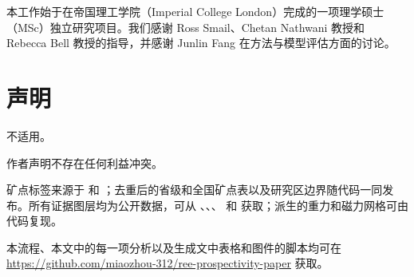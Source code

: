 \documentclass[pdflatex,sn-apa]{sn-jnl}
\begin{document}
\backmatter

本工作始于在帝国理工学院（Imperial College London）完成的一项理学硕士（MSc）独立研究项目。我们感谢 Ross Smail、Chetan Nathwani 教授和 Rebecca Bell 教授的指导，并感谢 Junlin Fang 在方法与模型评估方面的讨论。

\section*{声明}

不适用。

作者声明不存在任何利益冲突。

矿点标签来源于 \citet{Orris2018} 和 \citet{Parsa2024}；去重后的省级和全国矿点表以及研究区边界随代码一同发布。所有证据图层均为公开数据，可从 \citet{McCafferty2023}、\citet{Jobin2017}、\citet{Miles2016}、\citet{BradleyDC2008} 和 \citet{Wheeler1996} 获取；派生的重力和磁力网格可由代码复现。

本流程、本文中的每一项分析以及生成文中表格和图件的脚本均可在 \url{https://github.com/miaozhou-312/ree-prospectivity-paper} 获取。
\end{document}

